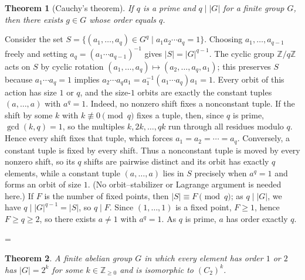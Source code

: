 \documentclass[11pt]{article}
\makeatletter
\theoremstyle{ntstyle}
\newtheorem{theorem}{Theorem}[subsection]
\let\nt@closedisplay\]
\def\nt@guardedclose{\@ifnextchar\par{\nt@closeafterpar}{\@ifnextchar\end{\postdisplaypenalty\@M\nt@closedisplay}{\nt@closedisplay}}}
\def\nt@closeafterpar\par{\@ifnextchar\par{\nt@closeafterpar}{\@ifnextchar\end{\postdisplaypenalty\@M\nt@closedisplay\par}{\nt@closedisplay\par}}}
\renewenvironment{proof}[1][\proofname]{\par
  \pushQED{\qed}\normalfont\topsep\medskipamount\edef\nt@afterproof{\@endparpenalty=\the\@endparpenalty\relax}\@beginparpenalty\@M\@endparpenalty\@M\let\]\nt@guardedclose\trivlist\item[]\textit{#1\@addpunct{.}} \ignorespaces}{\ifvmode\addpenalty\@M\fi\popQED\nt@afterproof\endtrivlist\@endpefalse}
\makeatother
\begin{document}
\begin{theorem}[Cauchy's theorem]\label{thm:6.7.1} If $q$ is a
	prime and $q \mid |G|$ for a finite group $G$, then there exists $g
		\in G$ whose order equals $q$.

\end{theorem}

\begin{proof} Consider the set $S = \{(a_1, \ldots, a_q)
		\in G^{q} \mid a_1 a_2 \cdots a_q = 1\}$. Choosing $a_1, \ldots,
		a_{q-1}$ freely and setting $a_q = (a_1 \cdots a_{q-1})^{-1}$ gives
	$|S| = |G|^{q-1}$. The cyclic group $\mathbb{Z}/q\mathbb{Z}$ acts on $S$ by
	cyclic rotation $(a_1, \ldots, a_q) \mapsto (a_2, \ldots, a_q, a_1)$;
	this preserves $S$ because $a_1 \cdots a_q = 1$ implies $a_2 \cdots
		a_q a_1 = a_1^{-1}(a_1 \cdots a_q)a_1 = 1$. Every orbit of this action
	has size $1$ or $q$, and the size-$1$ orbits are exactly the constant
	tuples $(a, \ldots, a)$ with $a^{q} = 1$. Indeed, no nonzero shift fixes
	a nonconstant tuple. If the shift
	by some $k$ with $k \not\equiv 0 \pmod{q}$ fixes a tuple, then, since $q$
	is prime, $\gcd(k, q) = 1$, so the multiples $k, 2k, \ldots, qk$ run
	through all residues modulo $q$. Hence every shift fixes that tuple,
	which forces $a_1 = a_2 = \cdots = a_q$. Conversely, a constant
	tuple is fixed by every shift. Thus a nonconstant tuple is moved by
	every nonzero shift, so its $q$ shifts are pairwise distinct and its
	orbit has exactly $q$ elements, while a constant tuple $(a, \ldots, a)$
	lies in $S$ precisely when $a^{q} = 1$ and forms an orbit of size $1$.
	(No orbit--stabilizer or Lagrange argument is needed here.) If $F$ is the
	number of fixed points, then $|S| \equiv F \pmod{q}$; as $q \mid |G|$,
	we have $q \mid |G|^{q-1} = |S|$, so $q \mid F$. Since $(1, \ldots,
		1)$ is a fixed point, $F \ge 1$, hence $F \ge q \ge 2$, so there
	exists $a \neq 1$ with $a^{q} = 1$. As $q$ is prime, $a$ has order
	exactly $q$.

\end{proof}
\begin{theorem}\label{thm:6.7.2} A finite abelian group $G$ in which
	every element has order $1$ or $2$ has $|G| = 2^{k}$ for some
	$k\in\mathbb{Z}_{\ge0}$ and is isomorphic to $(C_2)^{k}$.

\end{theorem}
\end{document}
